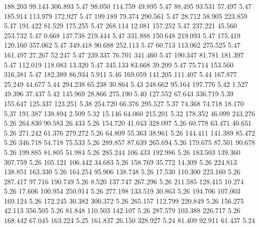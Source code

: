  188.203   99.143  306.893         5.47
  98.050  114.759   49.895         5.47
  88.495   93.531   57.497         5.47
 185.914  113.979  172.927         5.47
 199.189   79.374  290.561         5.47
  28.712   58.905  223.859         5.47
 191.422   81.529  175.255         5.47
 268.114   12.081  157.252         5.47
 237.221   45.560  253.732         5.47
   0.668  137.738  219.444         5.47
 331.888  150.648  219.093         5.47
 175.419  120.160  357.062         5.47
 349.418   90.688  252.113         5.47
  60.713  113.062  275.525         5.47
 161.497   27.267   52.247         5.47
 239.337   76.701  341.460         5.47
 190.347   81.781  181.397         5.47
 112.019  118.083   13.320         5.47
 345.133   83.668   39.209         5.47
  75.714  153.560  316.381         5.47
 182.389   86.934    5.911         5.46
 169.059  141.205  111.407         5.44
 167.877   25.249   44.677         5.44
 294.238   65.238   30.864         5.43
 248.662   95.164  197.776         5.42
   1.527   49.396   37.437         5.42
 145.969   28.866  275.190         5.40
 127.552   67.643  336.719         5.39
 155.647  125.337  123.251         5.38
 254.720   66.376  295.527         5.37
  74.368   74.718   18.170         5.37
 191.387  138.894    2.509         5.32
  15.146   64.060  215.201         5.32
 178.352   46.099  243.276         5.26
 264.830   90.583   26.433         5.26
 154.720   41.043  328.097         5.26
  60.778   63.471   40.651         5.26
 271.242   61.376  279.272         5.26
  64.809   55.363   38.961         5.26
 144.411  141.389   85.472         5.26
 346.718   54.718   75.533         5.26
 289.857   87.639  265.694         5.26
 179.675   87.501   90.678         5.26
 199.885   81.805   51.984         5.26
 285.244  106.433  192.986         5.26
 183.503  139.360  307.759         5.26
 105.121  106.442   34.683         5.26
 158.769   35.772   14.309         5.26
 224.813  138.851  163.330         5.26
 164.254   95.906  138.748         5.26
  17.530  110.300  223.160         5.26
 287.417   97.716  190.749         5.26
   8.520  137.747  267.296         5.26
 211.585  128.415   10.274         5.26
  17.606  100.954  250.914         5.26
 277.198  133.519   30.863         5.26
 194.706  107.003  169.124         5.26
 172.245   30.382  300.372         5.26
 265.157  112.799  220.849         5.26
 156.275   42.113  356.505         5.26
  81.848  110.503  142.107         5.26
 287.579  103.388  226.717         5.26
 168.442   67.045  163.224         5.25
 161.837   26.150  328.927         5.24
  81.409   92.911   61.437         5.24
